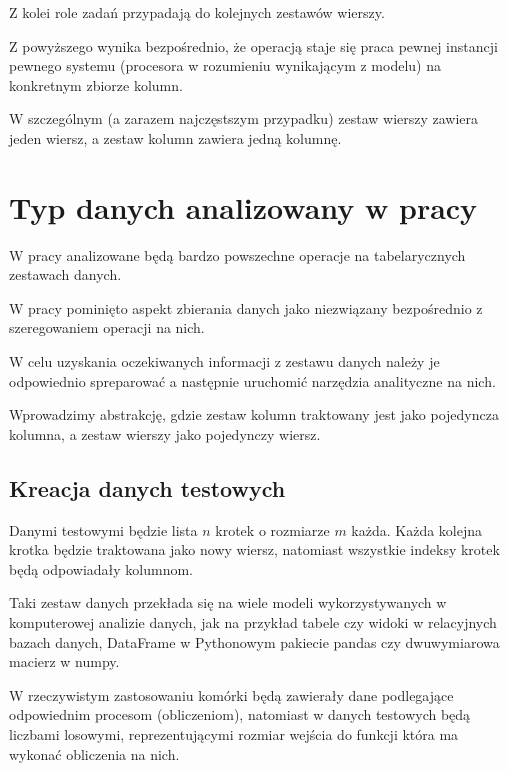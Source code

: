 \documentclass[brudnopis]{xmgr}
\begin{document}
Z kolei role zadań przypadają do kolejnych zestawów wierszy.

Z powyższego wynika bezpośrednio, że operacją staje się praca pewnej instancji pewnego systemu (procesora w rozumieniu wynikającym z modelu) na konkretnym zbiorze kolumn.

W szczególnym (a zarazem najczęstszym przypadku) zestaw wierszy zawiera jeden wiersz, a zestaw kolumn zawiera jedną kolumnę.


\chapter{Typ danych analizowany w pracy}

W pracy analizowane będą bardzo powszechne operacje na tabelarycznych zestawach danych.

W pracy pominięto aspekt zbierania danych jako niezwiązany bezpośrednio z szeregowaniem operacji na nich.

W celu uzyskania oczekiwanych informacji z zestawu danych należy je odpowiednio spreparować a następnie uruchomić narzędzia analityczne na nich.

Wprowadzimy abstrakcję, gdzie zestaw kolumn traktowany jest jako pojedyncza kolumna, a zestaw wierszy jako pojedynczy wiersz.


\section{Kreacja danych testowych}

Danymi testowymi będzie lista $n$ krotek o rozmiarze $m$ każda.
Każda kolejna krotka będzie traktowana jako nowy wiersz, natomiast wszystkie indeksy krotek będą odpowiadały kolumnom. 


Taki zestaw danych przekłada się na wiele modeli wykorzystywanych w komputerowej analizie danych, jak na przykład tabele czy widoki w relacyjnych bazach danych, DataFrame w Pythonowym pakiecie pandas czy dwuwymiarowa macierz w numpy.

W rzeczywistym zastosowaniu komórki będą zawierały dane podlegające odpowiednim procesom (obliczeniom), natomiast w danych testowych będą liczbami losowymi, reprezentującymi rozmiar wejścia do funkcji która ma wykonać obliczenia na nich.
\end{document}
